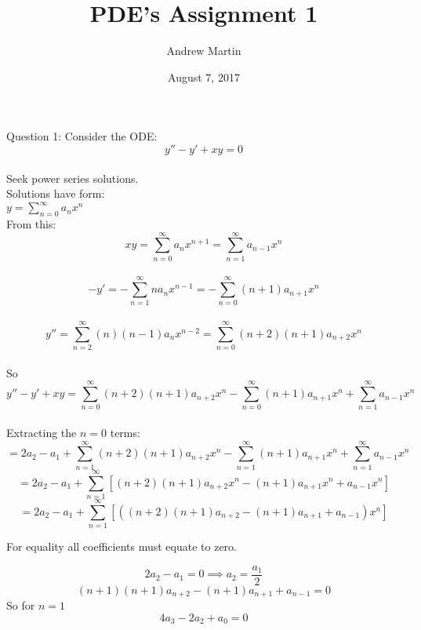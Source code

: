 \documentclass[a4paper]{article}
\begin{document}
	\title{PDE's Assignment 1}
	\date{August 7, 2017}
	\author{Andrew Martin}
	\maketitle
	
	Question 1:
	Consider the ODE:\\
	$$y''-y'+xy=0$$\\
	Seek power series solutions.\\
	Solutions have form:\\ 
	$y=\sum_{n=0}^{\infty}a_nx^n$\\
	From this:\\
	$$xy=\sum_{n=0}^{\infty}a_nx^{n+1}=\sum_{n=1}^{\infty}a_{n-1}x^{n}$$\\
	$$-y'=-\sum_{n=1}^{\infty}na_nx^{n-1}=-\sum_{n=0}^{\infty}(n+1)a_{n+1}x^{n}$$\\
	$$y''=\sum_{n=2}^{\infty}(n)(n-1)a_nx^{n-2} = \sum_{n=0}^{\infty}(n+2)(n+1)a_{n+2}x^{n}$$\\
	
	So\\
	$$y''-y'+xy=\sum_{n=0}^{\infty}(n+2)(n+1)a_{n+2}x^{n}-\sum_{n=0}^{\infty}(n+1)a_{n+1}x^{n}+\sum_{n=1}^{\infty}a_{n-1}x^{n}$$\\
	Extracting the $n=0$ terms:\\
	$$=2a_2-a_1+\sum_{n=1}^{\infty}(n+2)(n+1)a_{n+2}x^{n}-\sum_{n=1}^{\infty}(n+1)a_{n+1}x^{n}+\sum_{n=1}^{\infty}a_{n-1}x^{n}$$
	$$=2a_2-a_1+\sum_{n=1}^{\infty}\left[(n+2)(n+1)a_{n+2}x^{n}-(n+1)a_{n+1}x^{n}+a_{n-1}x^{n}\right] $$
	$$=2a_2-a_1+\sum_{n=1}^{\infty}\left[\left((n+2)(n+1)a_{n+2}-(n+1)a_{n+1}+a_{n-1}\right)x^{n}\right] $$
	
	For equality all coefficients must equate to zero.
	
	$$2a_2-a_1=0 \implies a_2=\frac{a_1}{2}$$
	$$(n+1)(n+1)a_{n+2}-(n+1)a_{n+1}+a_{n-1}=0$$
	So for $n=1$ 
	$$4a_{3}-2a_{2}+a_0=0$$
	
\end{document}
